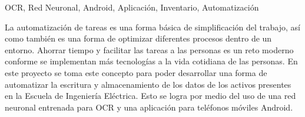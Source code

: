 
\begin{resumen}{OCR, Red Neuronal, Android, Aplicación, Inventario, Automatización}

La automatización de tareas es una forma básica de simplificación del trabajo, así como también es una forma de optimizar diferentes procesos dentro de un entorno. Ahorrar tiempo y facilitar las tareas a las personas es un reto moderno conforme se implementan más tecnologías a la vida cotidiana de las personas. En este proyecto se toma este concepto para poder desarrollar una forma de automatizar la escritura y almacenamiento de los datos de los activos presentes en la Escuela de Ingeniería Eléctrica. Esto se logra por medio del uso de una red neuronal entrenada para OCR y una aplicación para teléfonos móviles Android.

\end{resumen}